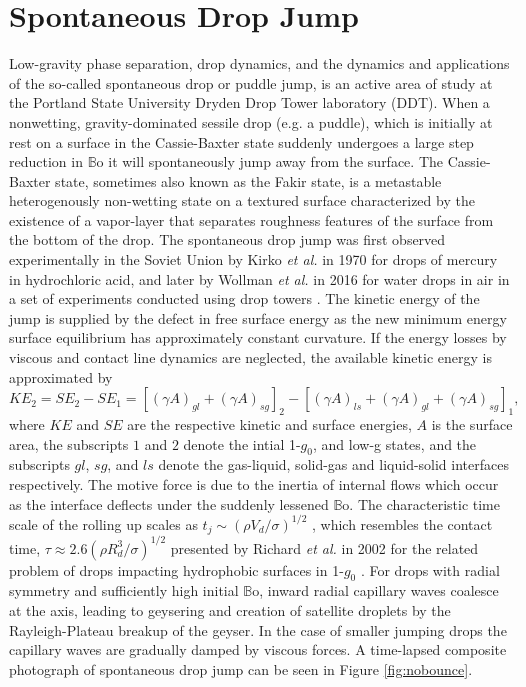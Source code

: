 \documentclass[12pt,a4paper,oneside]{book}
\begin{document}
\section{Spontaneous Drop Jump}
Low-gravity phase separation, drop dynamics, and the dynamics and applications of the so-called spontaneous drop or puddle jump, is an active area of study at the Portland State University Dryden Drop Tower laboratory (DDT). When a nonwetting, gravity-dominated sessile drop (e.g. a puddle), which is initially at rest on a surface in the Cassie-Baxter state suddenly undergoes a large step reduction in $\mathbb{B}\mbox{o}$ it will spontaneously jump away from the surface. The Cassie-Baxter state, sometimes also known as the Fakir state, is a metastable heterogenously non-wetting state on a textured surface characterized by the existence of a vapor-layer that separates roughness features of the surface from the bottom of the drop. The spontaneous drop jump was first observed experimentally in the Soviet Union by Kirko \emph{et al.} \cite{kirko_phenomenon_1970} in 1970 for drops of mercury in hydrochloric acid, and later by Wollman \emph{et al.} in 2016 for water drops in air in a set of experiments conducted using drop towers \cite{wollman_more_2016}. The kinetic energy of the jump is supplied by the defect in free surface energy as the new minimum energy surface equilibrium has approximately constant curvature. If the energy losses by viscous and contact line dynamics are neglected, the available kinetic energy is approximated by
\[KE_2 = SE_2 - SE_1 = [(\gamma A)_{gl} + (\gamma A)_{sg}]_2 - [(\gamma A)_{ls} + (\gamma A)_{gl} + (\gamma A)_{sg}]_1, \]
where $KE$ and $SE$ are the respective kinetic and surface energies, $A$ is the surface area, the subscripts $1$ and $2$ denote the intial 1-$g_0$, and low-g states, and the subscripts ${gl}$, ${sg}$, and ${ls}$ denote the gas-liquid, solid-gas and liquid-solid interfaces respectively. The motive force is due to the inertia of internal flows which occur as the interface deflects under the suddenly lessened $\mathbb{B}\mbox{o}$. The characteristic time scale of the rolling up scales as $t_j \sim (\rho V_d/\sigma)^{1/2}$ \cite{attari_puddle_2016}, which resembles the contact time, $\tau \approx 2.6(\rho R^3_d/\sigma)^{1/2}$ presented by Richard \emph{et al.} in 2002 for the related problem of drops impacting hydrophobic surfaces in 1-$g_0$ \cite{richard_surface_2002}. For drops with radial symmetry and sufficiently high initial $\mathbb{B}\mbox{o}$, inward radial capillary waves coalesce at the axis, leading to geysering and creation of satellite droplets by the Rayleigh-Plateau breakup of the geyser. In the case of smaller jumping drops the capillary waves are gradually damped by viscous forces. A time-lapsed composite photograph of spontaneous drop jump can be seen in Figure \ref{fig:nobounce}.
\end{document}
